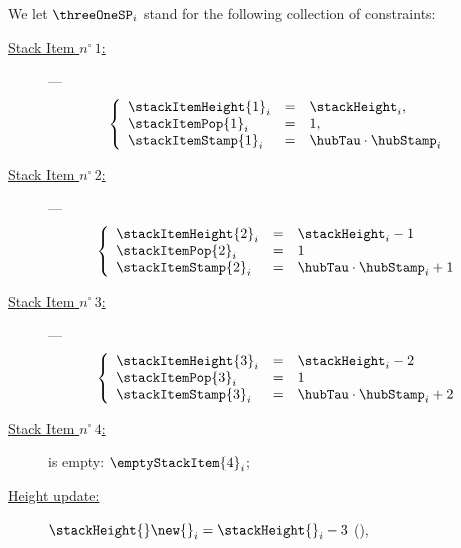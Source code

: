 
We let $\threeOneSP_{i}$ stand for the following collection of constraints:
\begin{description}
	\item[\underline{Stack Item $n^\circ\,1$:}] ---
	\[
	\left\{
		\begin{array}{lcl}
			\stackItemHeight{1}_{i}	& = & \stackHeight_{i}, \\
			\stackItemPop{1}_{i}	& = & 1, \\
			\stackItemStamp{1}_{i}	& = & \hubTau \cdot \hubStamp_{i}
		\end{array}
	\right.
	\]
	\item[\underline{Stack Item $n^\circ\,2$:}] ---
	\[
	\left\{
		\begin{array}{lcl}
			\stackItemHeight{2}_{i}	& = & \stackHeight_{i} - 1 \\
			\stackItemPop{2}_{i}	& = & 1 \\
			\stackItemStamp{2}_{i}	& = & \hubTau \cdot \hubStamp_{i} + 1
		\end{array}
	\right.
	\]
	\item[\underline{Stack Item $n^\circ\,3$:}] ---
	\[
	\left\{
		\begin{array}{lcl}
			\stackItemHeight{3}_{i}	& = & \stackHeight_{i} - 2 \\
			\stackItemPop{3}_{i}	& = & 1 \\
			\stackItemStamp{3}_{i}	& = & \hubTau \cdot \hubStamp_{i} + 2
		\end{array}
	\right.
	\]
	\item[\underline{Stack Item $n^\circ\,4$:}] is empty: $\emptyStackItem{4} _{i}$;
	\item[\underline{Height update:}] $\stackHeight{}\new{}_{i} = \stackHeight{}_{i} - 3$ \quad (\sanityCheck),
\end{description}





